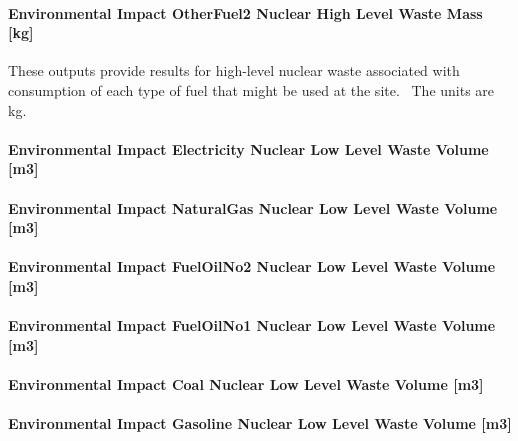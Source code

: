 \paragraph{Environmental Impact OtherFuel2 Nuclear High Level Waste Mass {[}kg{]}}\label{environmental-impact-otherfuel2-nuclear-high-level-waste-mass-kg}

These outputs provide results for high-level nuclear waste associated with consumption of each type of fuel that might be used at the site.~ The units are kg.

\paragraph{Environmental Impact Electricity Nuclear Low Level Waste Volume {[}m3{]}}\label{environmental-impact-electricity-nuclear-low-level-waste-volume-m3}

\paragraph{Environmental Impact NaturalGas Nuclear Low Level Waste Volume {[}m3{]}}\label{environmental-impact-natural-gas-nuclear-low-level-waste-volume-m3}

\paragraph{Environmental Impact FuelOilNo2 Nuclear Low Level Waste Volume {[}m3{]}}\label{environmental-impact-fuel-oil-2-nuclear-low-level-waste-volume-m3}

\paragraph{Environmental Impact FuelOilNo1 Nuclear Low Level Waste Volume {[}m3{]}}\label{environmental-impact-fuel-oil-1-nuclear-low-level-waste-volume-m3}

\paragraph{Environmental Impact Coal Nuclear Low Level Waste Volume {[}m3{]}}\label{environmental-impact-coal-nuclear-low-level-waste-volume-m3}

\paragraph{Environmental Impact Gasoline Nuclear Low Level Waste Volume {[}m3{]}}\label{environmental-impact-gasoline-nuclear-low-level-waste-volume-m3}

